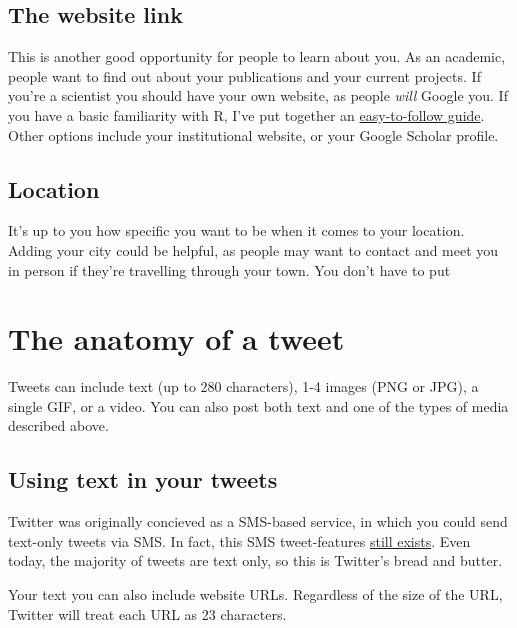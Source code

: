 \documentclass[]{book}
\begin{document}
\hypertarget{the-website-link}{%
\subsection{The website link}\label{the-website-link}}

This is another good opportunity for people to learn about you. As an academic, people want to find out about your publications and your current projects. If you're a scientist you should have your own website, as people \emph{will} Google you. If you have a basic familiarity with R, I've put together an \href{https://www.dsquintana.blog/free-website-in-r-easy/}{easy-to-follow guide}. Other options include your institutional website, or your Google Scholar profile.

\hypertarget{location}{%
\subsection{Location}\label{location}}

It's up to you how specific you want to be when it comes to your location. Adding your city could be helpful, as people may want to contact and meet you in person if they're travelling through your town. You don't have to put

\hypertarget{the-anatomy-of-a-tweet}{%
\section{The anatomy of a tweet}\label{the-anatomy-of-a-tweet}}

Tweets can include text (up to 280 characters), 1-4 images (PNG or JPG), a single GIF, or a video. You can also post both text and one of the types of media described above.

\hypertarget{using-text-in-your-tweets}{%
\subsection{Using text in your tweets}\label{using-text-in-your-tweets}}

Twitter was originally concieved as a SMS-based service, in which you could send text-only tweets via SMS. In fact, this SMS tweet-features \href{https://help.twitter.com/en/using-twitter/twitter-sms}{still exists}. Even today, the majority of tweets are text only, so this is Twitter's bread and butter.

Your text you can also include website URLs. Regardless of the size of the URL, Twitter will treat each URL as 23 characters.
\end{document}
